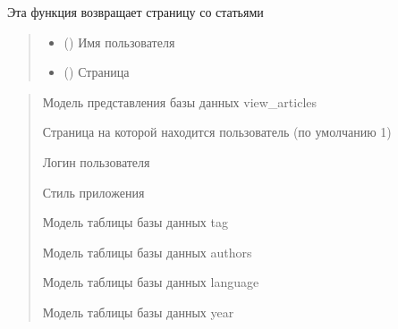 \documentclass[letterpaper,10pt,russian]{sphinxmanual}
\begin{document}
\begin{fulllineitems}
\label{\detokenize{blueprints:blueprints.select_books.article}}
\pysigstartsignatures
{}
\pysigstopsignatures
\sphinxAtStartPar
Эта функция возвращает страницу со статьями
\begin{quote}\begin{description}
\begin{itemize}
\item {} 
\sphinxAtStartPar
{} () \textendash{} Имя пользователя

\item {} 
\sphinxAtStartPar
{} () \textendash{} Страница

\end{itemize}

\end{description}\end{quote}
\begin{description}
\begin{quote}\begin{description}
\sphinxAtStartPar
Модель представления базы данных view\_articles

\sphinxAtStartPar
Страница на которой находится пользователь (по умолчанию 1)

\sphinxAtStartPar
Логин пользователя

\sphinxAtStartPar
Стиль приложения

\sphinxAtStartPar
Модель таблицы базы данных tag

\sphinxAtStartPar
Модель таблицы базы данных authors

\sphinxAtStartPar
Модель таблицы базы данных language

\sphinxAtStartPar
Модель таблицы базы данных year


\end{description}
\end{quote}
\end{description}
\end{fulllineitems}
\end{document}
